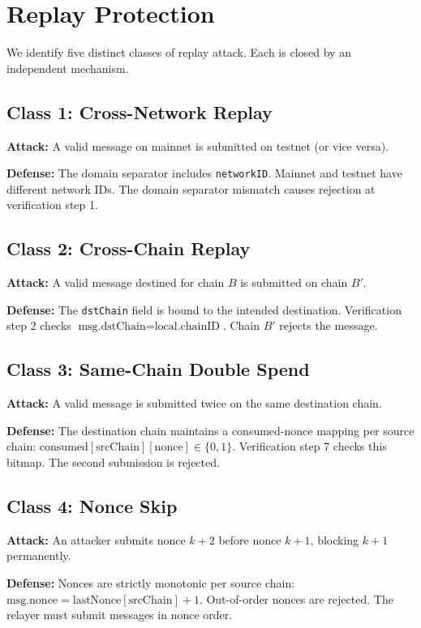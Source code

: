 \section{Replay Protection}


We identify five distinct classes of replay attack. Each is closed by an independent mechanism.

\subsection{Class 1: Cross-Network Replay}

\textbf{Attack:} A valid message on mainnet is submitted on testnet (or vice versa).

\textbf{Defense:} The domain separator includes \texttt{networkID}. Mainnet and testnet have different network IDs. The domain separator mismatch causes rejection at verification step 1.

\subsection{Class 2: Cross-Chain Replay}

\textbf{Attack:} A valid message destined for chain $B$ is submitted on chain $B'$.

\textbf{Defense:} The \texttt{dstChain} field is bound to the intended destination. Verification step 2 checks $\text{msg.dstChain} = \text{local.chainID}$. Chain $B'$ rejects the message.

\subsection{Class 3: Same-Chain Double Spend}

\textbf{Attack:} A valid message is submitted twice on the same destination chain.

\textbf{Defense:} The destination chain maintains a consumed-nonce mapping per source chain: $\text{consumed}[\text{srcChain}][\text{nonce}] \in \{0, 1\}$. Verification step 7 checks this bitmap. The second submission is rejected.

\subsection{Class 4: Nonce Skip}

\textbf{Attack:} An attacker submits nonce $k+2$ before nonce $k+1$, blocking $k+1$ permanently.

\textbf{Defense:} Nonces are strictly monotonic per source chain: $\text{msg.nonce} = \text{lastNonce}[\text{srcChain}] + 1$. Out-of-order nonces are rejected. The relayer must submit messages in nonce order.

